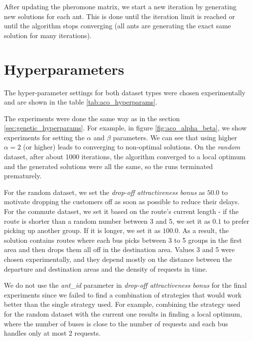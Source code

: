 After updating the pheromone matrix, we start a new iteration by generating new solutions for each ant. This is done until the iteration limit is reached or until the algorithm stops converging (all ants are generating the exact same solution for many iterations).

\section{Hyperparameters}\label{sec:aco_hyperparams}

The hyper-parameter settings for both dataset types were chosen experimentally and are shown in the table \ref{tab:aco_hyperparams}. 

The experiments were done the same way as in the section \ref{sec:genetic_hyperparams}. For example, in figure \ref{fig:aco_alpha_beta}, we show experiments for setting the $\alpha$ and $\beta$ parameters. We can see that using higher $\alpha = 2$ (or higher) leads to converging to non-optimal solutions. On the \textit{random} dataset, after about 1000 iterations, the algorithm converged to a local optimum and the generated solutions were all the same, so the runs terminated prematurely.

For the random dataset, we set the \textit{drop-off attractiveness bonus} as $50.0$ to motivate dropping the customers off as soon as possible to reduce their delays. For the commute dataset, we set it based on the route's current length - if the route is shorter than a random number between 3 and 5, we set it as $0.1$ to prefer picking up another group. If it is longer, we set it as $100.0$. As a result, the solution contains routes where each bus picks between 3 to 5 groups in the first area and then drops them all off in the destination area. Values 3 and 5 were chosen experimentally, and they depend mostly on the distance between the departure and destination areas and the density of requests in time.

We do not use the \textit{ant\_id} parameter in \textit{drop-off attractiveness bonus} for the final experiments since we failed to find a combination of strategies that would work better than the single strategy used. For example, combining the strategy used for the random dataset with the current one results in finding a local optimum, where the number of buses is close to the number of requests and each bus handles only at most 2 requests.

